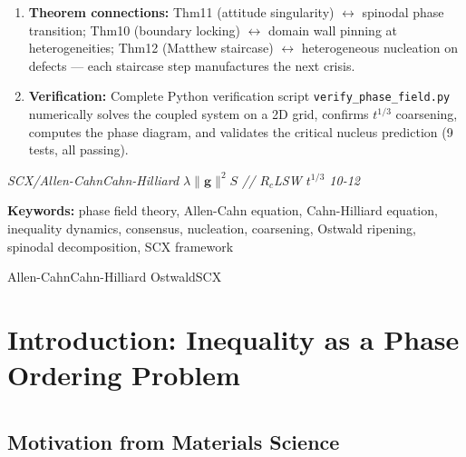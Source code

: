 \documentclass[12pt,a4paper]{article}
\theoremstyle{plain}
\theoremstyle{definition}
\newcommand{\gf}{\mathbf{g}}          %
\newcommand{\Sf}{S}                   %
\newcommand{\Rc}{R_c}                 %
\begin{document}
\begin{scxbox}[ Abstract]
\begin{enumerate}[label=(\arabic*)]
    \item \textbf{Theorem connections:} Thm11 (attitude singularity) $\leftrightarrow$
          spinodal phase transition; Thm10 (boundary locking) $\leftrightarrow$ domain wall
          pinning at heterogeneities; Thm12 (Matthew staircase) $\leftrightarrow$
          heterogeneous nucleation on defects — each staircase step manufactures
          the next crisis.

    \item \textbf{Verification:} Complete Python verification script
          \texttt{verify\_phase\_field.py} numerically solves the coupled system on
          a 2D grid, confirms $t^{1/3}$ coarsening, computes the phase diagram,
          and validates the critical nucleus prediction (9 tests, all passing).
\end{enumerate}

\bigskip
\noindent
\textit{SCX\textbf{}/Allen-CahnCahn-Hilliard $\lambda\|\gf\|^2\Sf$ // $\Rc$LSW $t^{1/3}$ 10-12}

\bigskip
\noindent
\textbf{Keywords:} phase field theory, Allen-Cahn equation, Cahn-Hilliard equation,
inequality dynamics, consensus, nucleation, coarsening, Ostwald ripening,
spinodal decomposition, SCX framework

\noindent
\textbf{} Allen-CahnCahn-Hilliard
OstwaldSCX
\end{scxbox}

\newpage
\tableofcontents
\newpage

\section{Introduction: Inequality as a Phase Ordering Problem}
\section*{}

\subsection{Motivation from Materials Science}
\subsection*{}
\end{document}
